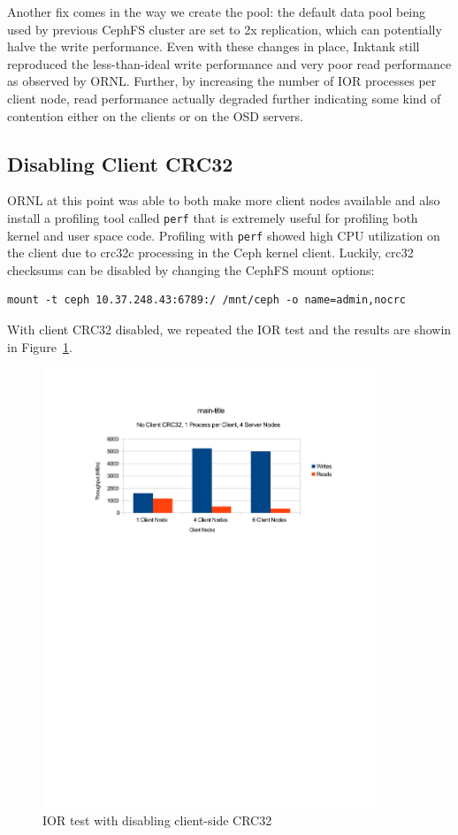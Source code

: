 \documentclass{article}
\begin{document}
Another fix comes in the way we create the pool: the default data pool being used
by previous CephFS cluster are set to 2x replication, which can potentially
halve the write performance. Even with these changes in place, Inktank still
reproduced the less-than-ideal write performance and very poor read
performance as observed by ORNL.  Further, by increasing the number of IOR
processes per client node, read performance actually degraded further
indicating some kind of contention either on the clients or on the OSD
servers.


\subsection{Disabling Client CRC32}

ORNL at this point was able to both make more client nodes available and also
install a profiling tool called \verb!perf! that is extremely useful for
profiling both kernel and user space code.  Profiling with \verb!perf! showed
high CPU utilization on the client due to crc32c processing in the Ceph kernel
client.  Luckily, crc32 checksums can be disabled by changing the CephFS mount
options:

\begin{Verbatim}
mount -t ceph 10.37.248.43:6789:/ /mnt/ceph -o name=admin,nocrc
\end{Verbatim}


With client CRC32 disabled, we repeated the IOR test and the results are showin
in Figure~\ref{fig:ior-no-client-crc32}. 

\begin{figure}[htb]
\centering
\includegraphics[width=4in]{ior-client-no-crc32}
\caption{IOR test with disabling client-side CRC32}
\label{fig:ior-no-client-crc32}
\end{figure}
\end{document}

